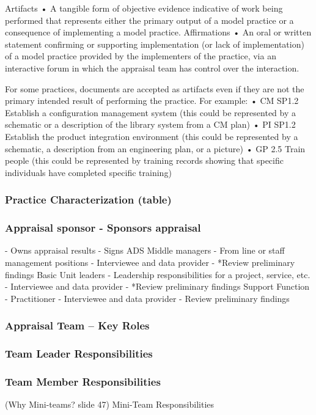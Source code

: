 Artifacts
• A tangible form of objective evidence indicative of work being performed that represents either the primary output of a model practice or a consequence of implementing a model practice.
Affirmations
• An oral or written statement confirming or supporting implementation (or lack of implementation) of a model practice provided by the implementers of the practice, via an interactive forum in which the appraisal team has control over the interaction.

For some practices, documents are accepted as artifacts even if they
are not the primary intended result of performing the practice. For
example:
• CM SP1.2 Establish a configuration management system (this
could be represented by a schematic or a description of the
library system from a CM plan)
• PI SP1.2 Establish the product integration environment (this
could be represented by a schematic, a description from an
engineering plan, or a picture)
• GP 2.5 Train people (this could be represented by training
records showing that specific individuals have completed specific
training)

\subsubsection{Practice Characterization (table)}


\subsubsection{Appraisal sponsor - Sponsors appraisal}
- Owns appraisal results
- Signs ADS
Middle managers - From line or staff management positions
- Interviewee and data provider
- *Review preliminary findings
Basic Unit leaders - Leadership responsibilities for a project, service, etc.
- Interviewee and data provider
- *Review preliminary findings
Support Function - Practitioner
- Interviewee and data provider
- Review preliminary findings


\subsubsection{Appraisal Team – Key Roles}

\subsubsection{Team Leader Responsibilities}

\subsubsection{Team Member Responsibilities}

(Why Mini-teams? slide 47)
Mini-Team Responsibilities